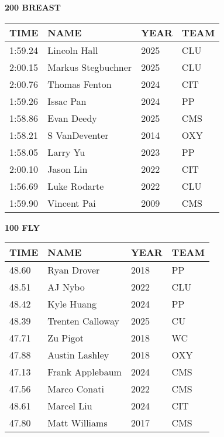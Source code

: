\begin{table}[H]
\centering
\begin{minipage}[t]{0.48\textwidth}
\centering
\textbf{200 BREAST}\\[0.1cm]
\begin{tabular}{@{}p{1.8cm}p{2.8cm}p{1.2cm}p{1.4cm}@{}}
\hline
    \textbf{TIME} & \textbf{NAME} & \textbf{YEAR} & \textbf{TEAM} \\
\hline
    1:59.24 & Lincoln Hall & 2025 & CLU \\
    2:00.15 & Markus Stegbuchner & 2025 & CLU \\
    2:00.76 & Thomas Fenton & 2024 & CIT \\
    1:59.26 & Issac Pan & 2024 & PP \\
    1:58.86 & Evan Deedy & 2025 & CMS \\
    1:58.21 & S VanDeventer & 2014 & OXY \\
    1:58.05 & Larry Yu & 2023 & PP \\
    2:00.10 & Jason Lin & 2022 & CIT \\
    1:56.69 & Luke Rodarte & 2022 & CLU \\
    1:59.90 & Vincent Pai & 2009 & CMS \\
\hline
\end{tabular}
\end{minipage}\hfill
\begin{minipage}[t]{0.48\textwidth}
\centering
\textbf{100 FLY}\\[0.1cm]
\begin{tabular}{@{}p{1.8cm}p{2.8cm}p{1.2cm}p{1.4cm}@{}}
\hline
    \textbf{TIME} & \textbf{NAME} & \textbf{YEAR} & \textbf{TEAM} \\
\hline
    48.60 & Ryan Drover & 2018 & PP \\
    48.51 & AJ Nybo & 2022 & CLU \\
    48.42 & Kyle Huang & 2024 & PP \\
    48.39 & Trenten Calloway & 2025 & CU \\
    47.71 & Zu Pigot & 2018 & WC \\
    47.88 & Austin Lashley & 2018 & OXY \\
    47.13 & Frank Applebaum & 2024 & CMS \\
    47.56 & Marco Conati & 2022 & CMS \\
    48.61 & Marcel Liu & 2024 & CIT \\
    47.80 & Matt Williams & 2017 & CMS \\
\hline
\end{tabular}
\end{minipage}
\end{table}

